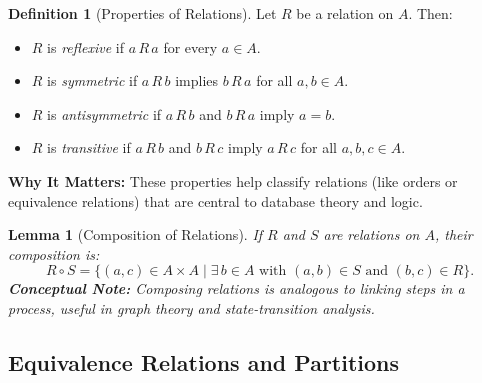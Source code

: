 \documentclass[12pt]{article}
\newtheorem{lemma}[theorem]{Lemma}
\theoremstyle{definition}
\newtheorem{definition}[theorem]{Definition}
\begin{document}
\begin{definition}[Properties of Relations]
  Let \(R\) be a relation on \(A\). Then:
  \begin{itemize}[itemsep=3pt]
    \item \(R\) is \emph{reflexive} if \(a\,R\,a\) for every \(a \in A\).
    \item \(R\) is \emph{symmetric} if \(a\,R\,b\) implies \(b\,R\,a\) for all \(a,b \in A\).
    \item \(R\) is \emph{antisymmetric} if \(a\,R\,b\) and \(b\,R\,a\) imply \(a = b\).
    \item \(R\) is \emph{transitive} if \(a\,R\,b\) and \(b\,R\,c\) imply \(a\,R\,c\) for all \(a,b,c \in A\).
  \end{itemize}
  \vspace{0.5em}
  \textbf{Why It Matters:} These properties help classify relations (like orders or equivalence relations) that are central to database theory and logic.
\end{definition}

\begin{center}
\end{center}

\begin{lemma}[Composition of Relations]
  If \(R\) and \(S\) are relations on \(A\), their composition is:
  \[
  R \circ S = \{ (a,c) \in A \times A \mid \exists\, b \in A \text{ with } (a,b) \in S \text{ and } (b,c) \in R \}.
  \]
  \vspace{0.5em}
  \textbf{Conceptual Note:} Composing relations is analogous to linking steps in a process, useful in graph theory and state-transition analysis.
\end{lemma}

\subsection{Equivalence Relations and Partitions}
\end{document}

